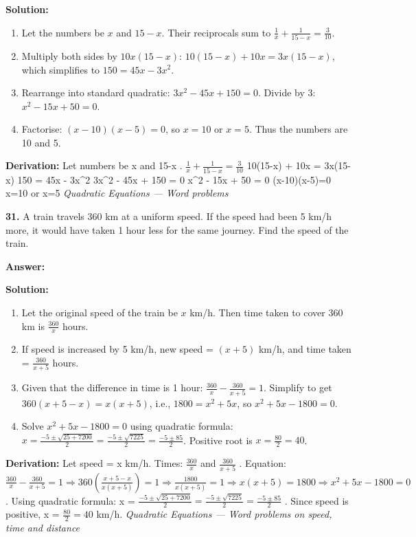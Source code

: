 \documentclass[12pt,a4paper]{exam}
\newcommand{\fitmath}[1]{%
  \sbox{\schmathbox}{$\displaystyle #1$}%
  \ifdim\wd\schmathbox>\linewidth
    \resizebox{\linewidth}{!}{\usebox{\schmathbox}}%
  \else
    \usebox{\schmathbox}%
  \fi}
\begin{document}
\begin{questions}
\textbf{Solution:}
\begin{enumerate}
  \item Let the numbers be $x$ and $15-x$. Their reciprocals sum to $\frac{1}{x} + \frac{1}{15-x} = \frac{3}{10}$.
  \item Multiply both sides by $10x(15-x)$: $10(15-x) + 10x = 3x(15-x)$, which simplifies to $150 = 45x - 3x^2$.
  \item Rearrange into standard quadratic: $3x^2 - 45x + 150 = 0$. Divide by 3: $x^2 - 15x + 50 = 0$.
  \item Factorise: $(x-10)(x-5)=0$, so $x=10$ or $x=5$. Thus the numbers are 10 and 5.
\end{enumerate}
\textbf{Derivation:}
Let numbers be  x  and  15-x .
 $\frac{1}{x} + \frac{1}{15-x} = \frac{3}{10}$ 
 10(15-x) + 10x = 3x(15-x) 
 150 = 45x - 3x\textasciicircum{}2 
 3x\textasciicircum{}2 - 45x + 150 = 0 
 x\textasciicircum{}2 - 15x + 50 = 0 
 (x-10)(x-5)=0 
 x=10  or  x=5 
\hfill \textit{Quadratic Equations — Word problems}
\vspace{0.3cm}

\question \textbf{31.} A train travels 360 km at a uniform speed. If the speed had been 5 km/h more, it would have taken 1 hour less for the same journey. Find the speed of the train.

\textbf{Answer:}
\begin{center}
\fitmath{40 km/h}
\end{center}

\textbf{Solution:}
\begin{enumerate}
  \item Let the original speed of the train be $x$ km/h. Then time taken to cover 360 km is $\frac{360}{x}$ hours.
  \item If speed is increased by 5 km/h, new speed = $(x+5)$ km/h, and time taken = $\frac{360}{x+5}$ hours.
  \item Given that the difference in time is 1 hour: $\frac{360}{x} - \frac{360}{x+5} = 1$. Simplify to get $360(x+5 - x) = x(x+5)$, i.e., $1800 = x^2 + 5x$, so $x^2 + 5x - 1800 = 0$.
  \item Solve $x^2+5x-1800=0$ using quadratic formula: $x = \frac{-5 \pm \sqrt{25+7200}}{2} = \frac{-5 \pm \sqrt{7225}}{2} = \frac{-5 \pm 85}{2}$. Positive root is $x = \frac{80}{2} = 40$.
\end{enumerate}
\textbf{Derivation:}
Let speed =  x  km/h. Times:  $\frac{360}{x}$  and  $\frac{360}{x+5}$ . Equation:  $\frac{360}{x} - \frac{360}{x+5} = 1 \Rightarrow 360\left(\frac{x+5-x}{x(x+5)}\right)=1 \Rightarrow \frac{1800}{x(x+5)} = 1 \Rightarrow x(x+5)=1800 \Rightarrow x^2+5x-1800=0$ . Using quadratic formula:  x = $\frac{-5 \pm \sqrt{25+7200}}{2} = \frac{-5 \pm \sqrt{7225}}{2} = \frac{-5 \pm 85}{2}$ . Since speed is positive,  x = $\frac{80}{2}=40$  km/h.
\hfill \textit{Quadratic Equations — Word problems on speed, time and distance}
\vspace{0.3cm}


\end{questions}
\end{document}
